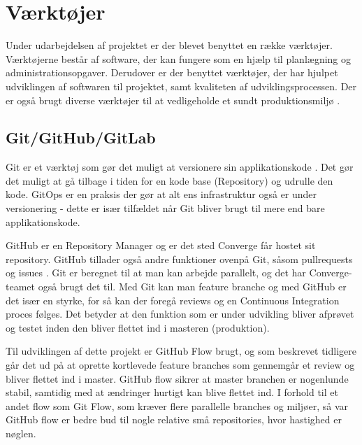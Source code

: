 \section{Værktøjer}

Under udarbejdelsen af projektet er der blevet benyttet en række værktøjer. Værktøjerne består af software, der kan fungere som en hjælp til planlægning og administrationsopgaver. Derudover er der benyttet værktøjer, der har hjulpet udviklingen af softwaren til projektet, samt kvaliteten af udviklingsprocessen. Der er også brugt diverse værktøjer til at vedligeholde et sundt produktionsmiljø \cite[Produktionsmiljø]{converge-terms}.

\subsection{Git/GitHub/GitLab}

Git \cite[Git]{converge-terms} er et værktøj som gør det muligt at versionere sin applikationskode \cite[Applikationskode]{converge-terms}. Det gør det muligt at gå tilbage i tiden for en kode base (Repository) og udrulle den kode. GitOps \cite[GitOps]{converge-terms} er en praksis der gør at alt ens infrastruktur også er under versionering - dette er især tilfældet når Git bliver brugt til mere end bare applikationskode.

GitHub \cite[GitHub]{converge-terms} er en Repository Manager \cite[Repository Manager]{converge-terms} og er det sted Converge får hostet sit repository. GitHub tillader også andre funktioner ovenpå Git, såsom pullrequests og issues \cite[Pullrequests and Issues]{converge-terms}. Git er beregnet til at man kan arbejde parallelt, og det har Converge-teamet også brugt det til. Med Git kan man feature branche \cite[Feature Branche]{converge-terms} og med GitHub er det især en styrke, for så kan der foregå reviews og en Continuous Integration \cite[Continuous Integration]{converge-terms} proces følges. Det betyder at den funktion som er under udvikling bliver afprøvet og testet inden den bliver flettet ind i masteren (produktion).

Til udviklingen af dette projekt er GitHub Flow \cite[GitHub Flow]{converge-terms} brugt, og som beskrevet tidligere går det ud på at oprette kortlevede feature branches som gennemgår et review og bliver flettet ind i master. GitHub flow sikrer at master branchen er nogenlunde stabil, samtidig med at ændringer hurtigt kan blive flettet ind. I forhold til et andet flow som Git Flow, som kræver flere parallelle branches og miljøer, så var GitHub flow er bedre bud til nogle relative små repositories, hvor hastighed er nøglen.

